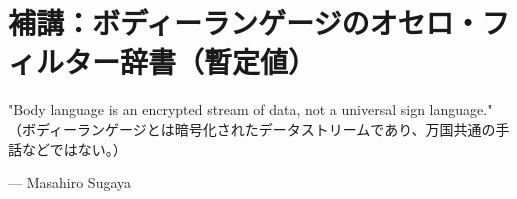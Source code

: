 \appendix
\chapter{補講：ボディーランゲージのオセロ・フィルター辞書（暫定値）}
\epigraph{"Body language is an encrypted stream of data, not a universal sign language."\\
\small（ボディーランゲージとは暗号化されたデータストリームであり、万国共通の手話などではない。）}{--- Masahiro Sugaya}

